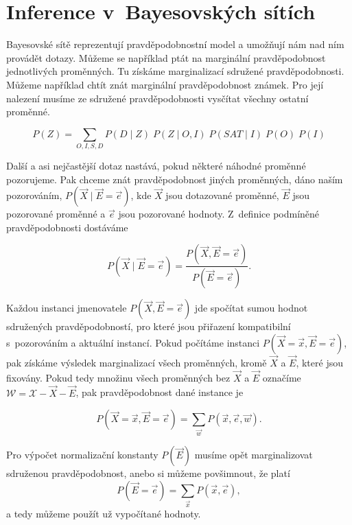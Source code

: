 \section{Inference v~Bayesovských sítích}

Bayesovské sítě reprezentují pravděpodobnostní model a umožňují nám nad ním provádět dotazy.
Můžeme se například ptát na marginální pravděpodobnost jednotlivých proměnných. 
Tu získáme marginalizací sdružené pravděpodobnosti.
Můžeme například chtít znát marginální pravděpodobnost známek. Pro její nalezení musíme ze sdružené pravděpodobnosti vysčítat všechny ostatní proměnné.

\begin{equation}
P(Z) = \sum_{O, I, S, D} P(D \mid Z) \; P(Z \mid O, I) \; P(SAT \mid I) \; P(O) \; P(I)
\end{equation}

Další a asi nejčastější dotaz nastává, pokud některé náhodné proměnné pozorujeme. 
Pak chceme znát pravděpodobnost jiných proměnných, dáno naším pozorováním, $P(\vec{X} \mid \vec{E} = \vec{e})$, kde $\vec{X}$ jsou dotazované proměnné, $\vec{E}$ jsou pozorované proměnné a $\vec{e}$ jsou pozorované hodnoty.
Z~definice podmíněné pravděpodobnosti dostáváme

\begin{equation}
P(\vec{X} \mid \vec{E} = \vec{e}) = \frac{P(\vec{X}, \vec{E} = \vec{e})}{P(\vec{E} = \vec{e})}.
\end{equation}

Každou instanci jmenovatele $P(\vec{X}, \vec{E} = \vec{e})$ jde spočítat sumou hodnot sdružených pravděpodobností, pro které jsou přiřazení kompatibilní s~pozorováním a aktuální instancí. 
Pokud počítáme instanci $P(\vec{X} = \vec{x}, \vec{E} = \vec{e})$, pak získáme výsledek marginalizací všech proměnných, kromě $\vec{X}$ a $\vec{E}$, které jsou fixovány.
Pokud tedy množinu všech proměnných bez $\vec{X}$ a $\vec{E}$ označíme $\mathcal{W} = \mathcal{X} - \vec{X} - \vec{E}$, pak pravděpodobnost dané instance je

\begin{equation}
P(\vec{X} = \vec{x}, \vec{E} = \vec{e}) = \sum_{\vec{w}} P(\vec{x}, \vec{e}, \vec{w}).
\end{equation}

Pro výpočet normalizační konstanty $P(\vec{E})$ musíme opět marginalizovat sdruženou pravděpodobnost, anebo si můžeme povšimnout, že platí
\begin{equation}
P(\vec{E} = \vec{e}) = \sum_{\vec{x}} P(\vec{x}, \vec{e}),
\end{equation}
a tedy můžeme použít už vypočítané hodnoty.

